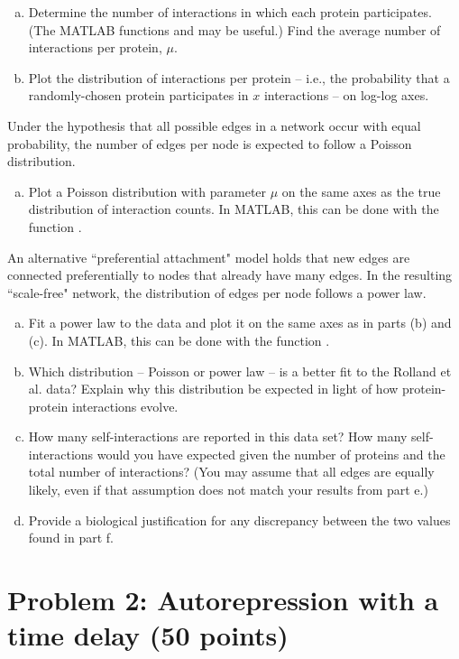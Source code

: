 \documentclass{article}
\begin{document}
\begin{enumerate}[a)]
\setlength{\itemsep}{0pt}
\item Determine the number of interactions in which each protein participates. (The MATLAB \linebreak functions  and  may be useful.) Find the average number of interactions per protein, $\mu$.
\item Plot the distribution of interactions per protein -- i.e., the probability that a randomly-chosen protein participates in $x$ interactions -- on log-log axes.
\end{enumerate}
Under the hypothesis that all possible edges in a network occur with equal probability, the number of edges per node is expected to follow a Poisson distribution. 
\begin{enumerate}[a)]
\setlength{\itemsep}{0pt}
\setcounter{enumi}{2}
\item Plot a Poisson distribution with parameter $\mu$ on the same axes as the true distribution of interaction counts. In MATLAB, this can be done with the function .
\end{enumerate}
An alternative ``preferential attachment" model holds that new edges are connected preferentially to nodes that already have many edges. In the resulting ``scale-free" network, the distribution of edges per node follows a power law.
\begin{enumerate}[a)]
\setlength{\itemsep}{0pt}
\setcounter{enumi}{3}
\item  Fit a power law to the data and plot it on the same axes as in parts (b) and (c). In MATLAB, this can be done with the function .
\item Which distribution -- Poisson or power law -- is a better fit to the Rolland et al. data? Explain why this distribution be expected in light of how protein-protein interactions evolve.
\item How many self-interactions are reported in this data set? How many self-interactions would you have expected given the number of proteins and the total number of interactions? (You may assume that all edges are equally likely, even if that assumption does not match your results from part e.)
\item Provide a biological justification for any discrepancy between the two values found in part f.
\end{enumerate}

\section*{Problem 2: Autorepression with a time delay (50 points)}
\end{document}
